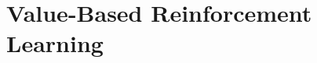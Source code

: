 \setcounter{chapter}{10}

\hypertarget{value-based-reinforcement-learning}{%
\chapter{Value-Based Reinforcement Learning}\label{value-based-reinforcement-learning}}
